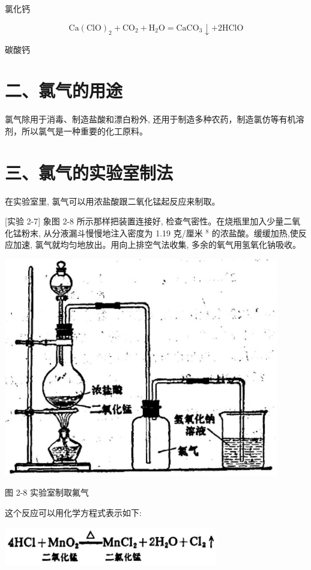 \documentclass[10pt]{article}
\begin{document}
氯化钙

\[
\mathrm{{Ca}}{\left( \mathrm{{ClO}}\right) }_{2} + {\mathrm{{CO}}}_{2} + {\mathrm{H}}_{2}\mathrm{O} = {\mathrm{{CaCO}}}_{3} \downarrow + 2\mathrm{{HClO}}
\]

碳酸钙

\section*{二、氯气的用途}

氯气除用于消毒、制造盐酸和漂白粉外, 还用于制造多种农药，制造氯仿等有机溶剂，所以氯气是一种重要的化工原料。

\section*{三、氯气的实验室制法}

在实验室里, 氯气可以用浓盐酸跟二氧化锰起反应来制取。

[实验 2-7] 象图 2-8 所示那样把装置连接好, 检查气密性。在烧瓶里加入少量二氧化锰粉末, 从分液漏斗慢慢地注入密度为 1.19 克/厘米 \({}^{8}\) 的浓盐酸。缓缓加热,使反应加速, 氯气就均匀地放出。用向上排空气法收集, 多余的氧气用氢氧化钠吸收。

\begin{center}
\includegraphics[max width=0.9\textwidth]{images/01912d0f-097c-7e75-8f32-4f326cd86c9f_37_119423.jpg}
\end{center}

图 2-8 实验室制取氟气

这个反应可以用化学方程式表示如下:

\begin{center}
\includegraphics[max width=0.7\textwidth]{images/01912d0f-097c-7e75-8f32-4f326cd86c9f_38_438218.jpg}
\end{center}
\end{document}
